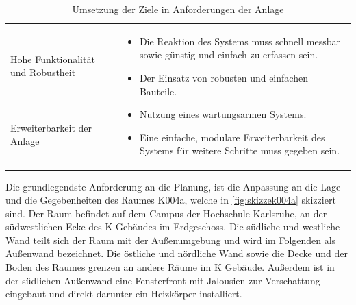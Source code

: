\begin{table}[H]
\begin{tabularx}{1\textwidth}{m{}m{}}
& \multirow{3}{\hsize}{
\begin{minipage}[t]{0.57\textwidth}
\begin{itemize}[itemsep=0pt,topsep=0pt,leftmargin=5mm]
\item Die Reaktion des Systems muss schnell messbar sowie günstig und einfach zu erfassen sein.
\item Der Einsatz von robusten und einfachen Bauteile.
\item Nutzung eines wartungsarmen Systems.
\item Eine einfache, modulare Erweiterbarkeit des Systems für weitere Schritte muss gegeben sein.
\end{itemize}
\end{minipage}
}  \\

\cmidrule[0.1pt](lr{2em}){1-1} 

Hohe Funktionalität und \newline Robustheit & \\

\cmidrule[0.1pt](lr{2em}){1-1} 

Erweiterbarkeit der Anlage
 &  \\

\bottomrule
\end{tabularx}
\caption{Umsetzung der Ziele in Anforderungen der Anlage}
\label{tab:anforderungen_umgebung}
\end{table}

Die grundlegendste Anforderung an die Planung, ist die Anpassung an die Lage und die Gegebenheiten des Raumes K004a, welche in \ref{fig:skizzek004a} skizziert sind. Der Raum befindet auf dem Campus der Hochschule Karlsruhe, an der südwestlichen Ecke des K Gebäudes im Erdgeschoss. Die südliche und westliche Wand teilt sich der Raum mit der Außenumgebung und wird im Folgenden als Außenwand bezeichnet. Die östliche und nördliche Wand sowie die Decke und der Boden des Raumes grenzen an andere Räume im K Gebäude. Außerdem ist in der südlichen Außenwand eine Fensterfront mit Jalousien zur Verschattung eingebaut und direkt darunter ein Heizkörper installiert.


